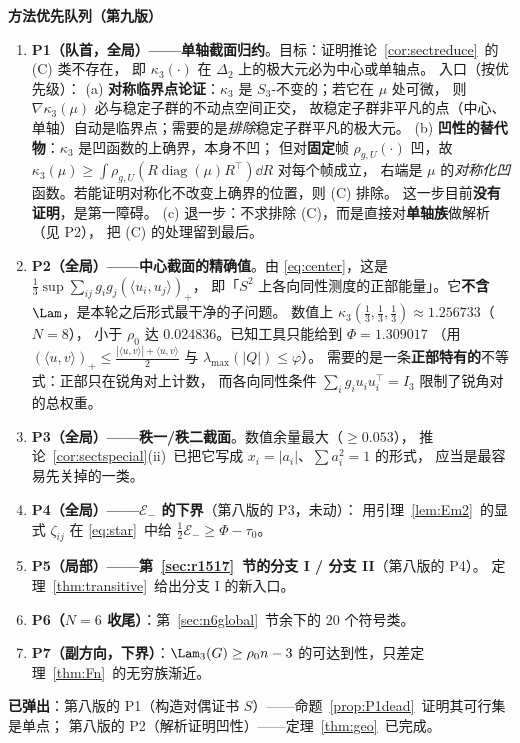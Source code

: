 \textbf{方法优先队列（第九版）}
\begin{enumerate}\itemsep3pt
\item \textbf{P1（队首，全局）——单轴截面归约}。目标：证明推论~\ref{cor:sectreduce}~的 (C) 类不存在，
即 $\kappa_3(\cdot)$ 在 $\Delta_2$ 上的极大元必为中心或单轴点。
入口（按优先级）：
(a) \textbf{对称临界点论证}：$\kappa_3$ 是 $S_3$-不变的；若它在 $\mu$ 处可微，
则 $\nabla\kappa_3(\mu)$ 必与稳定子群的不动点空间正交，
故稳定子群非平凡的点（中心、单轴）自动是临界点；需要的是\emph{排除}稳定子群平凡的极大元。
(b) \textbf{凹性的替代物}：$\kappa_3$ 是凹函数的上确界，本身不凹；
但对\textbf{固定}帧 $\rho_{g,U}(\cdot)$ 凹，故
$\kappa_3(\mu)\ge\int\rho_{g,U}(R\operatorname{diag}(\mu)R^\top)\dd R$ 对每个帧成立，
右端是 $\mu$ 的\emph{对称化凹}函数。若能证明对称化不改变上确界的位置，则 (C) 排除。
这一步目前\textbf{没有证明}，是第一障碍。
(c) 退一步：不求排除 (C)，而是直接对\textbf{单轴族}做解析（见 P2），
把 (C) 的处理留到最后。
\item \textbf{P2（全局）——中心截面的精确值}。由 \eqref{eq:center}，这是
$\frac13\sup\sum_{ij}g_ig_j(\langle u_i,u_j\rangle)_+$，
即「$S^2$ 上各向同性测度的正部能量」。它\textbf{不含} $\Lam$，是本轮之后形式最干净的子问题。
数值上 $\kappa_3(\frac13,\frac13,\frac13)\approx1.256733$（$N=8$），
小于 $\rho_0$ 达 $0.024836$。已知工具只能给到 $\Phi=1.309017$
（用 $(\langle u,v\rangle)_+\le\frac{|\langle u,v\rangle|+\langle u,v\rangle}2$ 与 $\lambda_{\max}(|Q|)\le\varphi$）。
需要的是一条\textbf{正部特有的}不等式：正部只在锐角对上计数，
而各向同性条件 $\sum_ig_iu_iu_i^\top=I_3$ 限制了锐角对的总权重。
\item \textbf{P3（全局）——秩一/秩二截面}。数值余量最大（$\ge0.053$），
推论~\ref{cor:sectspecial}(ii)~已把它写成 $x_i=|a_i|$、$\sum a_i^2=1$ 的形式，
应当是最容易先关掉的一类。
\item \textbf{P4（全局）——$\mathcal E_-$ 的下界}（第八版的 P3，未动）：
用引理~\ref{lem:Em2}~的显式 $\zeta_{ij}$ 在 \eqref{eq:star}~中给 $\frac12\mathcal E_-\ge\Phi-\tau_0$。
\item \textbf{P5（局部）——第~\ref{sec:r1517}~节的分支 I / 分支 II}（第八版的 P4）。
定理~\ref{thm:transitive}~给出分支 I 的新入口。
\item \textbf{P6（$N=6$ 收尾）}：第~\ref{sec:n6global}~节余下的 $20$ 个符号类。
\item \textbf{P7（副方向，下界）}：$\Lam_3(G)\ge\rho_0n-3$ 的可达到性，只差定理~\ref{thm:Fn}~的无穷族渐近。
\end{enumerate}

\textbf{已弹出}：第八版的 P1（构造对偶证书 $S$）——命题~\ref{prop:P1dead}~证明其可行集是单点；
第八版的 P2（解析证明凹性）——定理~\ref{thm:geo}~已完成。

